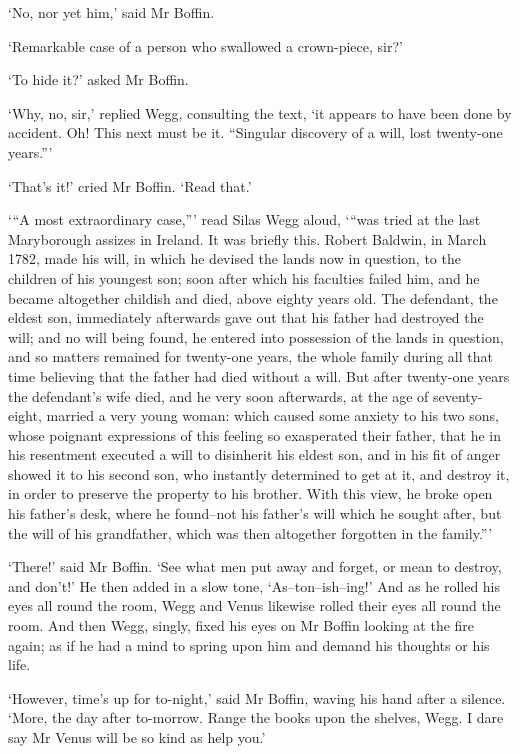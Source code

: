 ‘No, nor yet him,’ said Mr Boffin.

‘Remarkable case of a person who swallowed a crown-piece, sir?’

‘To hide it?’ asked Mr Boffin.

‘Why, no, sir,’ replied Wegg, consulting the text, ‘it appears to have
been done by accident. Oh! This next must be it. “Singular discovery of
a will, lost twenty-one years.”’

‘That’s it!’ cried Mr Boffin. ‘Read that.’

‘“A most extraordinary case,”’ read Silas Wegg aloud, ‘“was tried at
the last Maryborough assizes in Ireland. It was briefly this. Robert
Baldwin, in March 1782, made his will, in which he devised the lands now
in question, to the children of his youngest son; soon after which his
faculties failed him, and he became altogether childish and died, above
eighty years old. The defendant, the eldest son, immediately afterwards
gave out that his father had destroyed the will; and no will being
found, he entered into possession of the lands in question, and so
matters remained for twenty-one years, the whole family during all
that time believing that the father had died without a will. But after
twenty-one years the defendant’s wife died, and he very soon afterwards,
at the age of seventy-eight, married a very young woman: which caused
some anxiety to his two sons, whose poignant expressions of this feeling
so exasperated their father, that he in his resentment executed a will
to disinherit his eldest son, and in his fit of anger showed it to his
second son, who instantly determined to get at it, and destroy it, in
order to preserve the property to his brother. With this view, he broke
open his father’s desk, where he found--not his father’s will which he
sought after, but the will of his grandfather, which was then altogether
forgotten in the family.”’

‘There!’ said Mr Boffin. ‘See what men put away and forget, or mean to
destroy, and don’t!’ He then added in a slow tone, ‘As--ton--ish--ing!’
And as he rolled his eyes all round the room, Wegg and Venus likewise
rolled their eyes all round the room. And then Wegg, singly, fixed his
eyes on Mr Boffin looking at the fire again; as if he had a mind to
spring upon him and demand his thoughts or his life.

‘However, time’s up for to-night,’ said Mr Boffin, waving his hand after
a silence. ‘More, the day after to-morrow. Range the books upon the
shelves, Wegg. I dare say Mr Venus will be so kind as help you.’

